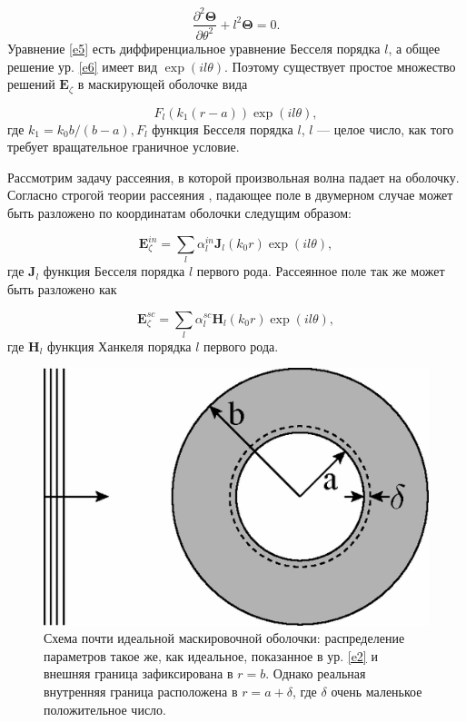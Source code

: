 \documentclass[a4paper, 12pt]{article}
\begin{document}
\begin{equation}\label{e6}
	\frac{\partial^2 \mathbf{\Theta}}{\partial \theta^2} + l^2 \mathbf{\Theta} = 0.
\end{equation}
Уравнение \eqref{e5} есть диффиренциальное уравнение Бесселя порядка $l$, а общее решение ур. \eqref{e6} имеет вид
$\exp(il\theta)$. Поэтому существует простое множество решений $\mathbf{E}_\zeta$ в маскирующей оболочке вида

\begin{equation}\label{e7}
	F_l(k_1(r-a))\exp(il\theta),
\end{equation}
где $k_1 = k_0 b/(b-a), F_l$ функция Бесселя порядка $l$, $l$ --- целое число, как того требует вращательное граничное 
условие.

Рассмотрим задачу рассеяния, в которой произвольная волна падает на оболочку. Согласно строгой теории рассеяния 
\cite{12}, падающее поле в двумерном случае может быть разложено по координатам оболочки следущим образом:

\begin{equation}\label{e8}
	\mathbf{E}_\zeta^{in} = \sum\limits_l \alpha_l^{in} \mathbf{J}_l(k_0 r)\exp(il\theta),
\end{equation}
где $\mathbf{J}_l$ функция Бесселя порядка $l$ первого рода. Рассеянное поле так же может быть разложено как

\begin{equation}\label{e9}
	\mathbf{E}_\zeta^{sc} = \sum\limits_l \alpha_l^{sc} \mathbf{H}_l(k_0 r)\exp(il\theta),
\end{equation}
где $\mathbf{H}_l$ функция Ханкеля порядка $l$ первого рода.

\begin{figure}[t]
  \centering
  \includegraphics[height=0.15\paperheight]{1.png}
  \caption{Схема почти идеальной маскировочной оболочки: распределение параметров такое же, как идеальное, показанное в
  ур. \eqref{e2} и внешняя граница зафиксирована в $r=b$. Однако реальная внутренняя граница расположена в 
  $r=a +\delta$, где $\delta$ очень маленькое положительное число.}
  \label{fig:1}
\end{figure}
\end{document}
